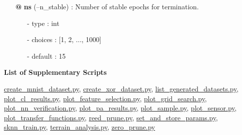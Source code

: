 {\begin{minipage}{\textwidth}
\begin{tcolorbox}[boxsep=0pt,top=10pt,left=10pt,right=10pt, bottom=10pt, arc=0pt, auto outer arc, colback=white, colframe=lightgray]
\begin{itemize}
\begin{itemize}
\item[-] type    \hspace{15pt}	: int
\item[-] choices \hspace{4pt} 	: [1, 2, ..., 1000]
\item[-] default \hspace{4pt} 	: 100 
\end{itemize}
\item[\textbf{@}] \textbf{ns} (--n\_stable) : Number of stable epochs for termination.
\begin{itemize}
\item[-] type    \hspace{15pt}	: int
\item[-] choices \hspace{4pt} 	: [1, 2, ..., 1000]
\item[-] default \hspace{4pt} 	: 15 
\end{itemize} 
\end{itemize}
\normalsize
\end{tcolorbox}
\end{minipage}}

\textbf{List of Supplementary Scripts}

\url{create\_mnist\_dataset.py}, \url{create\_xor\_dataset.py}, \url{list\_generated\_datasets.py}, \url{plot\_cl\_results.py}, \url{plot\_feature\_selection.py}, \url{plot\_grid\_search.py}, \url{plot\_nn\_verification.py}, \url{plot\_pa\_results.py}, \url{plot\_sample.py}, \url{plot\_sensor.py}, \url{plot\_transfer\_functions.py}, \url{reed\_prune.py}, \url{set\_and\_store\_params.py}, \url{sknn\_train.py}, \url{terrain\_analysis.py}, \url{zero\_prune.py}